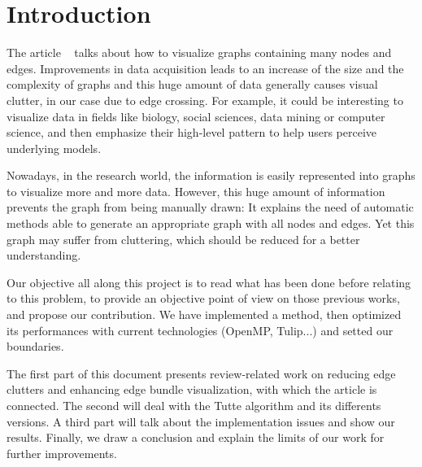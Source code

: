 \chapter*{Introduction}

The article ~\cite{pd} talks about how to visualize graphs containing many nodes and edges. Improvements in data acquisition leads to an increase of the size and the complexity of graphs and this huge amount of data generally causes visual clutter, in our case due to edge crossing.
For example, it could be interesting to visualize data in fields like biology, social sciences, data mining or computer science, and then emphasize their high-level pattern to help users perceive underlying models.


Nowadays, in the research world, the information is easily represented into graphs to visualize more and more data. However, this huge amount of information prevents the graph from being manually drawn:  It explains the need of automatic methods able to generate an appropriate graph with all nodes and edges. Yet this graph may suffer from cluttering, which should be reduced for a better understanding.

Our objective all along this project is to read what has been done before relating to this problem, to provide an objective point of view on those previous works, and propose our contribution. We have implemented a method, then optimized its performances with
 current technologies (OpenMP, Tulip...) and setted our boundaries. 


The first part of this document presents review-related work on reducing edge clutters and enhancing edge bundle visualization, with which the article is connected. The second will deal with the Tutte algorithm and its differents versions. A third part will talk about the implementation issues and show our results. Finally, we draw a conclusion and explain the limits of our work for further improvements.
